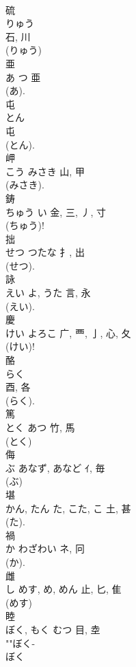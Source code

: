 \documentclass[8pt]{extreport}
\begin{document}
\begin{CJK}{UTF8}{min}
\\	硫	
\\	りゅう	
\\	石, 川		
\\	(りゅう) 
\\	亜	
\\	あ	つ	亜	
\\	(あ). 
\\	屯	
\\	とん	
\\	屯	
\\	(とん). 
\\	岬	
\\	こう	みさき	山, 甲	
\\	(みさき). 
\\	鋳	
\\	ちゅう	い	金, 三, 丿, 寸	
\\	(ちゅう)! 
\\	拙	
\\	せつ	つたな	扌, 出	
\\	(せつ). 
\\	詠	
\\	えい	よ, うた	言, 永	
\\	(えい). 
\\	慶	
\\	けい	よろこ	广, 覀, 亅, 心, 夂	
\\	(けい)!	
\\	酪	
\\	らく	
\\	酉, 各	
\\	(らく). 
\\	篤	
\\	とく	あつ	竹, 馬	
\\	(とく) 
\\	侮	
\\	ぶ	あなず, あなど	ｲ, 毎	
\\	(ぶ) 
\\	堪	
\\	かん, たん	た, こた, こ	土, 甚	
\\	(た). 
\\	禍	
\\	か	わざわい	ネ, 冋	
\\	(か). 
\\	雌	
\\	し	めす, め, めん	止, 匕, 隹	
\\	(めす) 
\\	睦	
\\	ぼく, もく	むつ	目, 坴	
\\	""ぼく-
\\	ぼく 

\end{CJK}
\end{document}
